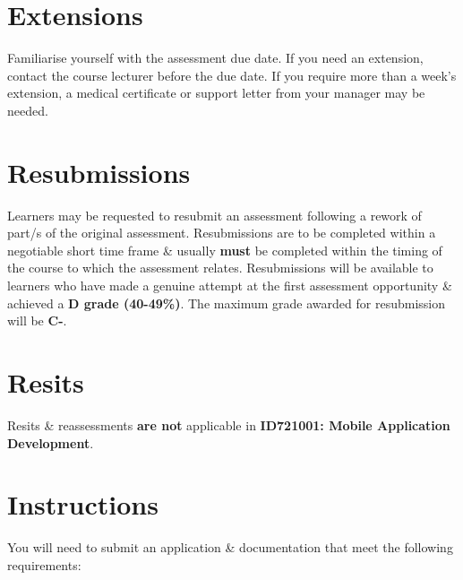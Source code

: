 \documentclass{article}
\begin{document}
\section*{Extensions}
Familiarise yourself with the assessment due date. If you need an extension, contact the course lecturer before the due date. If you require more than a week's extension, a medical certificate or support letter from your manager may be needed.

\section*{Resubmissions}
Learners may be requested to resubmit an assessment following a rework of part/s of the original assessment. Resubmissions are to be completed within a negotiable short time frame \& usually \textbf{must} be completed within the timing of the course to which the assessment relates. Resubmissions will be available to learners who have made a genuine attempt at the first assessment opportunity \& achieved a \textbf{D grade (40-49\%)}. The maximum grade awarded for resubmission will be \textbf{C-}.

\section*{Resits}
Resits \& reassessments \textbf{are not} applicable in \textbf{ID721001: Mobile Application Development}.

\section*{Instructions}
You will need to submit an application \& documentation that meet the following requirements:
\end{document}
